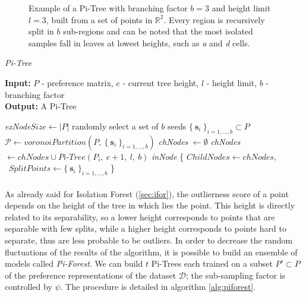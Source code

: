 \begin{figure}[h!]
    \centering
    
    \caption{Example of a Pi-Tree with branching factor $b = 3$ and height limit $l = 3$, built from a set of points in $\mathbb{R}^2$. Every region is recursively split in $b$ sub-regions and can be noted that the most isolated samples fall in leaves at lowest heights, such as \textit{a} and \textit{d} cells.}
    \label{fig:voronoi}
\end{figure}

\begin{algorithm}[h]
    \caption{\textit{Pi-Tree}}
    \label{alg:pitree}
    \textbf{Input:} $P$ - preference matrix, $e$ - current tree height, $l$ - height limit, $b$ - branching factor\\
    \textbf{Output:} A Pi-Tree
    \begin{algorithmic}[1]
            \State \Return \textit{exNode}{$Size \gets |P|$}
        \Else
            \State randomly select a set of $b$ seeds $\{\ \textbf{s}_i\ \}_{i=1,...,b} \subset P$
            \State $\mathcal{P} \gets voronoiPartition(P,\ \{\ \textbf{s}_i\ \}_{i=1,...,b})$
            \State \textit{chNodes} $\gets \emptyset$
                \State \textit{chNodes} $\gets chNodes \cup \textit{Pi-Tree}(P_i,\ e+1,\ l,\ b)$
            \EndFor
            \State \Return \textit{inNode} \{
                                            $ChildNodes \gets chNodes$, \\
                \quad \quad \quad \quad \quad \quad \quad \quad \quad\ $SplitPoints \gets \{\ \textbf{s}_i\ \}_{i=1,...,b}$
            \}   
        \EndIf
    \end{algorithmic}
\end{algorithm}

\paragraph{}
As already said for Isolation Forest (\ref{sec:ifor}), the outlierness score of a point depends on the height of the tree in which lies the point. This height is directly related to its separability, so a lower height corresponds to points that are separable with few splits, while a higher height corresponds to points hard to separate, thus are less probable to be outliers. \newline
In order to decrease the random fluctuations of the results of the algorithm, it is possible to build an ensemble of models called \textit{Pi-Forest}. We can build $t$ Pi-Trees each trained on a subset $P' \subset P$ of the preference representations of the dataset $\mathcal{D}$; the sub-sampling factor is controlled by $\psi$. \newline
The procedure is detailed in algorithm \ref{alg:piforest}.

